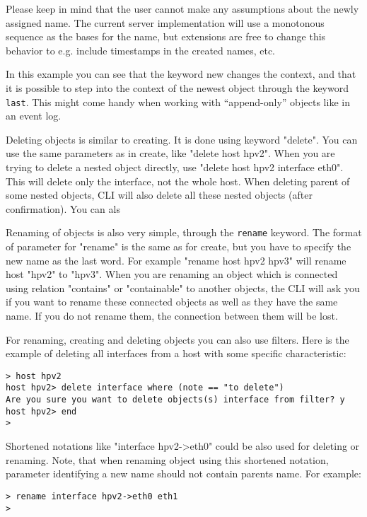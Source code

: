 \documentclass[deska]{subfiles}
\begin{document}
Please keep in mind that the user cannot make any assumptions about the newly assigned name.  The current server
implementation will use a monotonous sequence as the bases for the name, but extensions are free to change this behavior
to e.g. include timestamps in the created names, etc.

In this example you can see that the keyword new changes the context, and that it is possible to step into the context
of the newest object through the keyword {\tt last}.  This might come handy when working with ``append-only'' objects
like in an event log.

Deleting objects is similar to creating. It is done using keyword "delete". You can use the same parameters as in
create, like "delete host hpv2". When you are trying to delete a nested object directly, use "delete host hpv2 interface
eth0". This will delete only the interface, not the whole host. When deleting parent of some nested objects, CLI will
also delete all these nested objects (after confirmation). You can als

Renaming of objects is also very simple, through the {\tt rename} keyword. The format of
parameter for "rename" is the same as for create, but you have to specify the new name as the last word. For example
"rename host hpv2 hpv3" will rename host "hpv2" to "hpv3". When you are renaming an object which is connected using relation
"contains" or "containable" to another objects, the CLI will ask you if you want to rename these connected objects
as well as they have the same name. If you do not rename them, the connection between them will be lost.

For renaming, creating and deleting objects you can also use filters. Here is the example of deleting all interfaces from
a host with some specific characteristic:

\begin{verbatim}
> host hpv2
host hpv2> delete interface where (note == "to delete")
Are you sure you want to delete objects(s) interface from filter? y
host hpv2> end
>
\end{verbatim}

Shortened notations like "interface hpv2->eth0" could be also used for deleting or renaming. Note, that when renaming
object using this shortened notation, parameter identifying a new name should not contain parents name. For example:

\begin{verbatim}
> rename interface hpv2->eth0 eth1
>
\end{verbatim}
\end{document}
